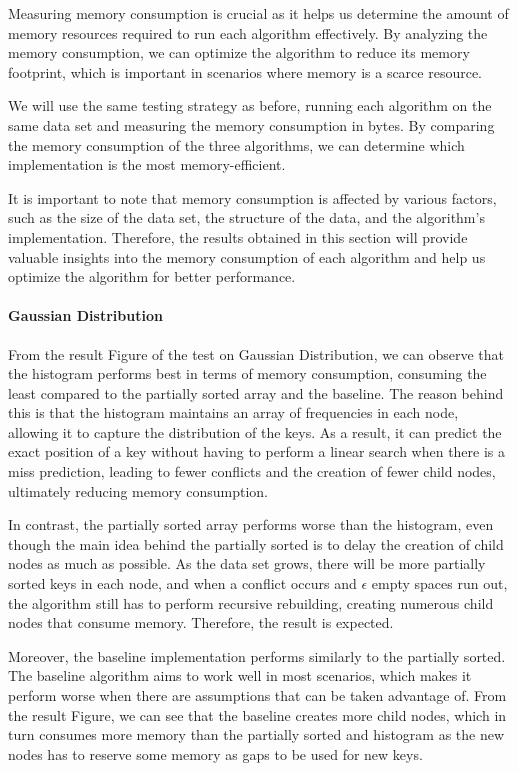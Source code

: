 \documentclass[11pt,a4paper]{article}
\begin{document}
Measuring memory consumption is crucial as it helps us determine the amount of memory resources required to run each algorithm effectively. By analyzing the memory consumption, we can optimize the algorithm to reduce its memory footprint, which is important in scenarios where memory is a scarce resource.

We will use the same testing strategy as before, running each algorithm on the same data set and measuring the memory consumption in bytes. By comparing the memory consumption of the three algorithms, we can determine which implementation is the most memory-efficient.

It is important to note that memory consumption is affected by various factors, such as the size of the data set, the structure of the data, and the algorithm's implementation. Therefore, the results obtained in this section will provide valuable insights into the memory consumption of each algorithm and help us optimize the algorithm for better performance.

\paragraph{Gaussian Distribution}

From the result Figure of the test on Gaussian Distribution, we can observe that the histogram performs best in terms of memory consumption, consuming the least compared to the partially sorted array and the baseline. The reason behind this is that the histogram maintains an array of frequencies in each node, allowing it to capture the distribution of the keys. As a result, it can predict the exact position of a key without having to perform a linear search when there is a miss prediction, leading to fewer conflicts and the creation of fewer child nodes, ultimately reducing memory consumption.

In contrast, the partially sorted array performs worse than the histogram, even though the main idea behind the partially sorted is to delay the creation of child nodes as much as possible. As the data set grows, there will be more partially sorted keys in each node, and when a conflict occurs and $\epsilon$ empty spaces run out, the algorithm still has to perform recursive rebuilding, creating numerous child nodes that consume memory. Therefore, the result is expected.

Moreover, the baseline implementation performs similarly to the partially sorted. The baseline algorithm aims to work well in most scenarios, which makes it perform worse when there are assumptions that can be taken advantage of. From the result Figure, we can see that the baseline creates more child nodes, which in turn consumes more memory than the partially sorted and histogram as the new nodes has to reserve some memory as \textsf{gaps} to be used for new keys.
\end{document}
